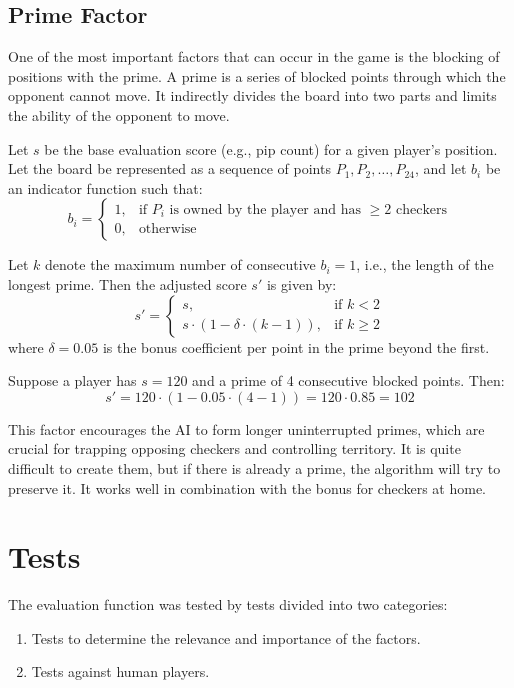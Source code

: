\subsection*{Prime Factor}
One of the most important factors that can occur in the game is the blocking of positions with the prime. A prime is a series of blocked points through which the opponent cannot move. It indirectly divides the board into two parts and limits the ability of the opponent to move.

Let $s$ be the base evaluation score (e.g., pip count) for a given player's position.
Let the board be represented as a sequence of points $P_1, P_2, \dots, P_{24}$, and let $b_i$ be an indicator function such that:
\[
b_i = 
\begin{cases}
1, & \text{if } P_i \text{ is owned by the player and has } \geq 2 \text{ checkers} \\
0, & \text{otherwise}
\end{cases}
\]

Let $k$ denote the maximum number of consecutive $b_i = 1$, i.e., the length of the longest prime. Then the adjusted score $s'$ is given by:
\[
s' = 
\begin{cases}
s, & \text{if } k < 2 \\
s \cdot \left(1 - \delta \cdot (k - 1)\right), & \text{if } k \geq 2
\end{cases}
\]
where $\delta = 0.05$ is the bonus coefficient per point in the prime beyond the first.

 Suppose a player has $s = 120$ and a prime of 4 consecutive blocked points. Then:
\[
s' = 120 \cdot (1 - 0.05 \cdot (4 - 1)) = 120 \cdot 0.85 = 102
\]

 This factor encourages the AI to form longer uninterrupted primes, which are crucial for trapping opposing checkers and controlling territory. It is quite difficult to create them, but if there is already a prime, the algorithm will try to preserve it. It works well in combination with the bonus for checkers at home.


\section{Tests}

The evaluation function was tested by tests divided into two categories:
\begin{enumerate}
    \item Tests to determine the relevance and importance of the factors.
    \item 
Tests against human players.
\end{enumerate}


